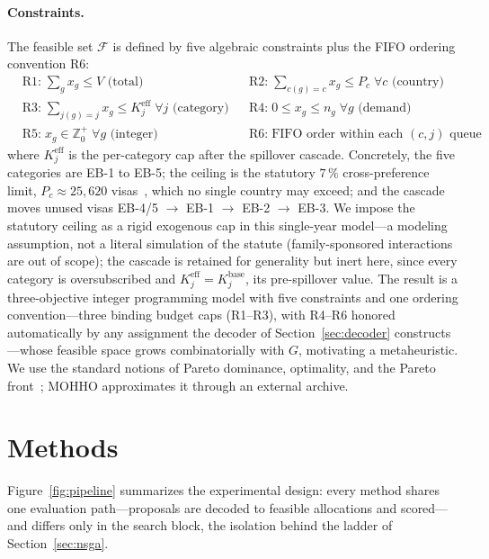 \documentclass[runningheads]{llncs}
\begin{document}
\paragraph{Constraints.}
The feasible set $\mathcal{F}$ is defined by five algebraic constraints plus the FIFO ordering convention R6:
\begin{align}
&\text{R1:}\; \textstyle\sum_{g} x_g \le V \text{ (total)}
&&\text{R2:}\; \textstyle\sum_{c(g)=c} x_g \le P_c \;\forall c \text{ (country)}\nonumber\\
&\text{R3:}\; \textstyle\sum_{j(g)=j} x_g \le K_j^{\text{eff}} \;\forall j \text{ (category)}
&&\text{R4:}\; 0 \le x_g \le n_g \;\forall g \text{ (demand)}\nonumber\\
&\text{R5:}\; x_g \in \mathbb{Z}^{+}_0 \;\forall g \text{ (integer)}
&&\text{R6:}\; \text{FIFO order within each } (c,j) \text{ queue}\nonumber
\end{align}
where $K_j^{\text{eff}}$ is the per-category cap after the spillover cascade. Concretely, the five categories are EB-1 to EB-5; the ceiling is the statutory $7\,\%$ cross-preference limit, $P_c \approx 25{,}620$ visas~\cite{uscis}, which no single country may exceed; and the cascade moves unused visas EB-4/5 $\rightarrow$ EB-1 $\rightarrow$ EB-2 $\rightarrow$ EB-3. We impose the statutory ceiling as a rigid exogenous cap in this single-year model---a modeling assumption, not a literal simulation of the statute (family-sponsored interactions are out of scope); the cascade is retained for generality but inert here, since every category is oversubscribed and $K_j^{\text{eff}}=K_j^{\text{base}}$, its pre-spillover value. The result is a three-objective integer programming model with five constraints and one ordering convention---three binding budget caps (R1--R3), with R4--R6 honored automatically by any assignment the decoder of Section~\ref{sec:decoder} constructs---whose feasible space grows combinatorially with $G$, motivating a metaheuristic. We use the standard notions of Pareto dominance, optimality, and the Pareto front~\cite{coello}; MOHHO approximates it through an external archive.

\section{Methods}
\label{sec:methods}

Figure~\ref{fig:pipeline} summarizes the experimental design: every method shares one evaluation path---proposals are decoded to feasible allocations and scored---and differs only in the search block, the isolation behind the ladder of Section~\ref{sec:nsga}.
\end{document}
